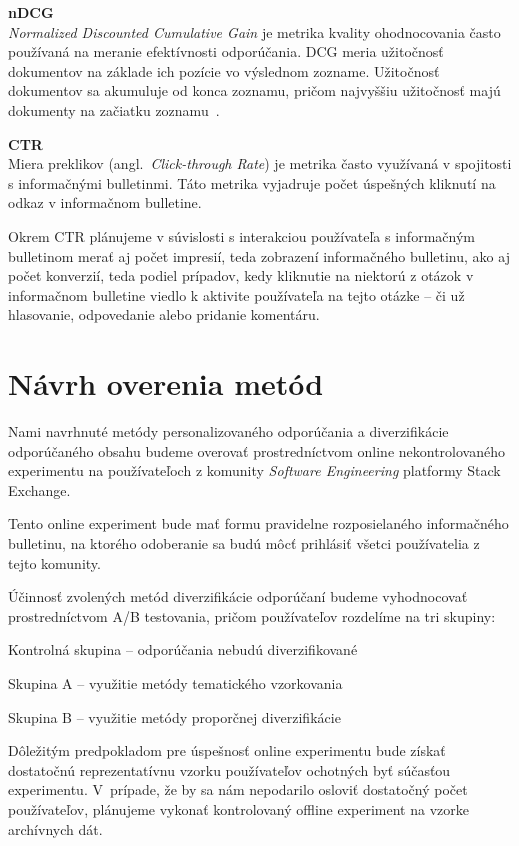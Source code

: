 \textbf{nDCG}\\
\textit{Normalized Discounted Cumulative Gain} je metrika kvality ohodnocovania často používaná na meranie efektívnosti
odporúčania. DCG meria užitočnosť dokumentov na základe ich pozície vo výslednom zozname. Užitočnosť dokumentov sa akumuluje
od konca zoznamu, pričom najvyššiu užitočnosť majú dokumenty na začiatku zoznamu~\cite{Jrvelin2002}.

\textbf{CTR}\\
Miera preklikov (angl.~\emph{Click-through Rate}) je metrika často využívaná v spojitosti s informačnými bulletinmi.
Táto metrika vyjadruje počet úspešných kliknutí na odkaz v informačnom bulletine.

Okrem CTR plánujeme v súvislosti s interakciou používateľa s informačným bulletinom merať aj počet impresií,
teda zobrazení informačného bulletinu, ako aj počet konverzií, teda podiel prípadov, kedy kliknutie na niektorú z otázok
v informačnom bulletine viedlo k aktivite používateľa na tejto otázke -- či už hlasovanie, odpovedanie alebo pridanie komentáru.


\section{Návrh overenia metód}

Nami navrhnuté metódy personalizovaného odporúčania a diverzifikácie odporúčaného obsahu budeme overovať prostredníctvom
online nekontrolovaného experimentu na používateľoch z komunity \textit{Software Engineering} platformy Stack Exchange.

Tento online experiment bude mať formu pravidelne rozposielaného informačného bulletinu, na ktorého odoberanie sa budú
môcť prihlásiť všetci používatelia z tejto komunity.

Účinnosť zvolených metód diverzifikácie odporúčaní budeme vyhodnocovať prostredníctvom A/B testovania, pričom používateľov
rozdelíme na tri skupiny:
\begin{my_enumerate}
    \item{Kontrolná skupina -- odporúčania nebudú diverzifikované}
    \item{Skupina A -- využitie metódy tematického vzorkovania}
    \item{Skupina B -- využitie metódy proporčnej diverzifikácie}
\end{my_enumerate}

Dôležitým predpokladom pre úspešnosť online experimentu bude získať dostatočnú reprezentatívnu vzorku používateľov
ochotných byť súčasťou experimentu. V~prípade, že by sa nám nepodarilo osloviť dostatočný počet používateľov, plánujeme
vykonať kontrolovaný offline experiment na vzorke archívnych dát.
